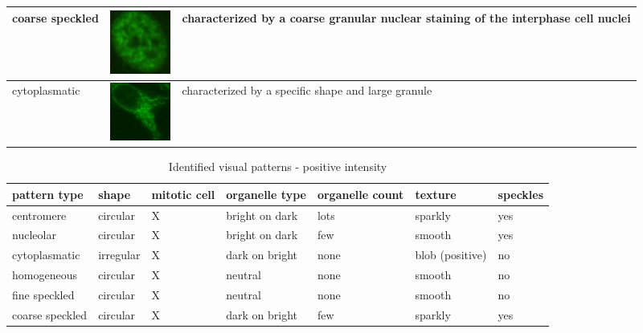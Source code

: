 \begin{table}
\begin{center}
\begin{tabular}{|m{2.3cm}|m{2.1cm}|m{8cm}|}
		coarse speckled & \vspace{5pt} \includegraphics[width=2cm]{Figures/describing/coarse_speckled} & characterized by a coarse granular nuclear staining of the interphase cell nuclei \\ \hline
		
		cytoplasmatic & \vspace{5pt} \includegraphics[width=2cm]{Figures/describing/cytoplasmatic} & characterized by a specific shape and large granule \\ \hline
	\end{tabular}
	\end{center}
\end{table}

\begin{table}
	\caption{Identified visual patterns - positive intensity}
	\label{tab:Vpata}
	\begin{tabular}{|m{2.2cm}|m{1.7cm}|m{2cm}|m{2cm}|m{1.2cm}|m{2cm}|m{1.2cm}|}
		\hline
		\textbf{pattern type} & \textbf{shape} & \textbf{mitotic cell} & \textbf{organelle type} & \textbf{organelle count} & \textbf{texture} & \textbf{speckles} \\ \hline
		centromere & circular & X & bright on dark & lots & sparkly  & yes \\ \hline
		nucleolar & circular & X & bright on dark & few & smooth & yes \\ \hline
		cytoplasmatic & irregular & X & dark on bright & none & blob (positive)  & no \\ \hline
		homogeneous & circular & X & neutral & none & smooth & no \\ \hline
		fine speckled & circular & X & neutral & none & smooth & no \\ \hline
		coarse speckled & circular & X & dark on bright & few & sparkly & yes \\ \hline
	\end{tabular}
\end{table}

